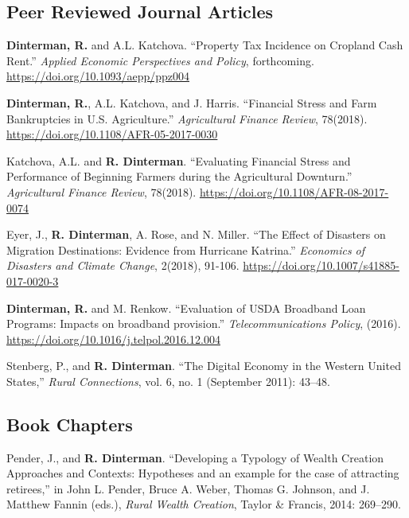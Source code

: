 \documentclass[letterpaper]{article}
\renewenvironment{itemize}{
  \begin{list}{}{
    \setlength{\leftmargin}{1.5em}
  }
}{
  \end{list}
}
\begin{document}
\subsection*{Peer Reviewed Journal Articles}
\begin{itemize}
\item \textbf{Dinterman, R.} and A.L. Katchova. ``Property Tax Incidence on Cropland Cash Rent.'' \emph{Applied Economic Perspectives and Policy}, forthcoming. \href{https://doi.org/10.1093/aepp/ppz004}{https://doi.org/10.1093/aepp/ppz004}
\item \textbf{Dinterman, R.}, A.L. Katchova, and J. Harris. ``Financial Stress and Farm Bankruptcies in U.S. Agriculture.'' \emph{Agricultural Finance Review}, 78(2018). \href{https://doi.org/10.1108/AFR-05-2017-0030}{https://doi.org/10.1108/AFR-05-2017-0030}
\item Katchova, A.L. and \textbf{R. Dinterman}. ``Evaluating Financial Stress and Performance of Beginning Farmers during the Agricultural Downturn.'' \emph{Agricultural Finance Review}, 78(2018). \href{https://doi.org/10.1108/AFR-08-2017-0074}{https://doi.org/10.1108/AFR-08-2017-0074}
\item Eyer, J., \textbf{R. Dinterman}, A. Rose, and N. Miller. ``The Effect of Disasters on Migration Destinations: Evidence from Hurricane Katrina.'' \emph{Economics of Disasters and Climate Change}, 2(2018), 91-106. \href{https://doi.org/10.1007/s41885-017-0020-3}{https://doi.org/10.1007/s41885-017-0020-3}
\item \textbf{Dinterman, R.} and M. Renkow. ``Evaluation of USDA Broadband Loan Programs: Impacts on broadband provision.'' \emph{Telecommunications Policy}, (2016). \href{https://doi.org/10.1016/j.telpol.2016.12.004}{https://doi.org/10.1016/j.telpol.2016.12.004}
\item Stenberg, P., and \textbf{R. Dinterman}. ``The Digital Economy in the Western United States,'' \emph{Rural Connections}, vol. 6, no. 1 (September 2011): 43--48.
\end{itemize}

\subsection*{Book Chapters}

\begin{itemize}
\item Pender, J., and \textbf{R. Dinterman}. ``Developing a Typology of Wealth Creation Approaches and Contexts: Hypotheses and an example for the case of attracting retirees,'' in  John L. Pender, Bruce A. Weber, Thomas G. Johnson, and J. Matthew Fannin (eds.), \emph{Rural Wealth Creation}, Taylor \& Francis, 2014: 269--290.
\end{itemize}
\end{document}
